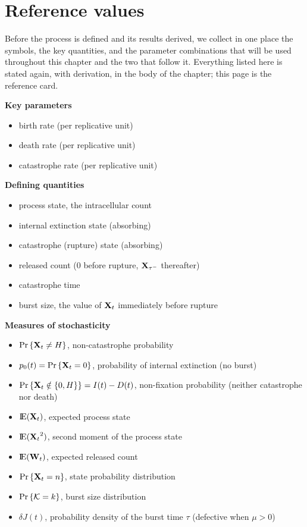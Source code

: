 \section{Reference values}
\label{sec:reference}

Before the process is defined and its results derived, we collect in one place
the symbols, the key quantities, and the parameter combinations that will be
used throughout this chapter and the two that follow it. Everything listed here
is stated again, with derivation, in the body of the chapter; this page is the
reference card.

\newcommand\indentA{3cm}

\noindent
\textbf{Key parameters}
\begin{itemize}[leftmargin=\indentA]
\item[$\lambda$ :]birth rate (per replicative unit)
\item[$\mu$ :]death rate (per replicative unit)
\item[$\delta$ :]catastrophe rate (per replicative unit)
\end{itemize}

\noindent
\textbf{Defining quantities}
\begin{itemize}[leftmargin=\indentA]
\item[$\xt$ :]process state, the intracellular count
\item[$\xt=0$ :]internal extinction state (absorbing)
\item[$\xt=H$ :]catastrophe (rupture) state (absorbing)
\item[$\wt$ :]released count ($0$ before rupture, ${\bf X}_{\tau^-}$ thereafter)
\item[$\tau$ :] catastrophe time
\item[$\Kb$ :]burst size, the value of $\xt$ immediately before rupture
\end{itemize}

\noindent
\textbf{Measures of stochasticity}
\begin{itemize}[leftmargin=\indentA]
\item[$I(t)$ :]${\text{Pr}\left\{{{\bf X}_t}\neq H\right\}}$, non-catastrophe probability
\item[$D(t)$ :]$p_0(t)={\text{Pr}\left\{{{\bf X}_t} = 0\right\}}$, probability of internal extinction (no burst)
\item[$\Ifix(t)$ :]${\text{Pr}\left\{{{\bf X}_t}\notin \{0,H\}\right\}} = I(t)-D(t)$, non-fixation probability (neither catastrophe nor death)
\item[$J(t)$ :]${\rm I}\!{\rm E}({{\bf X}_t})$, expected process state
\item[$K(t)$ :]${\rm I}\!{\rm E}({{\bf X}_t}^2)$, second moment of the process state
\item[$V(t)$ :]${\rm I}\!{\rm E}({{\bf W}_t})$, expected released count
\item[$p_n(t)$ :]${\text{Pr}\left\{{{\bf X}_t} = n\right\}}$, state probability distribution
\item[$P_k$ :]${\text{Pr}\left\{\mathcal{K} = k\right\}}$, burst size distribution
\item[$\varphi(t)$ :]$\delta J(t)$, probability density of the burst time $\tau$ (defective when $\mu>0$)
\end{itemize}

